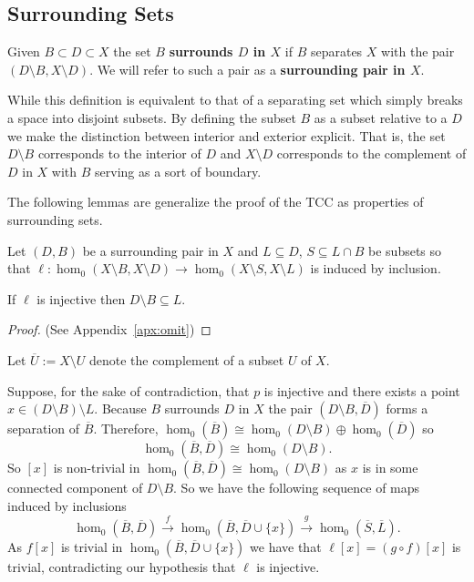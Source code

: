 \subsection{Surrounding Sets}

Given $B\subset D \subset X$ the set $B$ \textbf{surrounds $D$ in $X$} if $B$ separates $X$ with the pair $(D\setminus B, X\setminus D)$.
We will refer to such a pair as a \textbf{surrounding pair in $X$}.

While this definition is equivalent to that of a separating set which simply breaks a space into disjoint subsets.
By defining the subset $B$ as a subset relative to a $D$ we make the distinction between interior and exterior explicit.
That is, the set $D\setminus B$ corresponds to the interior of $D$ and $X\setminus D$ corresponds to the complement of $D$ in $X$ with $B$ serving as a sort of boundary.

The following lemmas are generalize the proof of the TCC as properties of surrounding sets.

\begin{lemma}\label{lem:coverage}
  Let $(D, B)$ be a surrounding pair in $X$ and $L\subseteq D$, $S\subseteq L\cap B$ be subsets so that $\ell: \hom_0(X\setminus B, X\setminus D)\to \hom_0(X\setminus S, X\setminus L)$ is induced by inclusion.

  If $\ell$ is injective then $D\setminus B\subseteq L$.
\end{lemma}
\begin{proof}
  (See Appendix~\ref{apx:omit})
\end{proof}
\proofatend
    Let $\overline{U} := X\setminus U$ denote the complement of a subset $U$ of $X$.

    Suppose, for the sake of contradiction, that $p$ is injective and there exists a point $x\in (D\setminus B)\setminus L$.
    Because $B$ surrounds $D$ in $X$ the pair $(D\setminus B, \overline{D})$ forms a separation of $\overline{B}$.
    Therefore, $\hom_0(\overline{B})\cong \hom_0(D\setminus B)\oplus \hom_0(\overline{D})$ so
    \[ \hom_0(\overline{B}, \overline{D})\cong \hom_0(D\setminus B). \]
    So $[x]$ is non-trivial in $\hom_0(\overline{B},\overline{D})\cong \hom_0(D\setminus B)$ as $x$ is in some connected component of $D\setminus B$.
    So we have the following sequence of maps induced by inclusions
    \[ \hom_0(\overline{B},\overline{D})\xrightarrow{f} \hom_0(\overline{B},\overline{D}\cup\{x\})\xrightarrow{g} \hom_0(\overline{S},\overline{L}).\]
    As $f[x]$ is trivial in $\hom_0(\overline{B},\overline{D}\cup\{x\})$ we have that $\ell[x] = (g\circ f)[x]$ is trivial, contradicting our hypothesis that $\ell$ is injective.
\endproofatend

